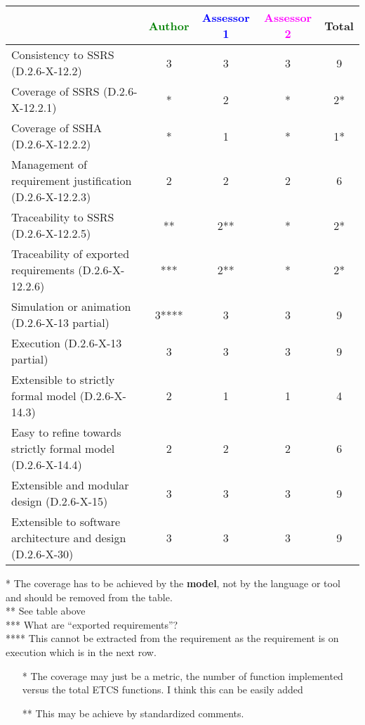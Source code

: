 \begin{tabular}{|l | c | c | c | c|}
\hline
& \textcolor{green}{Author} & \textcolor{blue}{Assessor 1} & \textcolor{magenta}{Assessor 2} & Total \\
\hline
Consistency to SSRS (D.2.6-X-12.2) &3 &3 &3 & 9 \\
\hline
Coverage of SSRS (D.2.6-X-12.2.1) &* &2 &* & 2* \\
\hline
Coverage of SSHA (D.2.6-X-12.2.2) &* &1 &* & 1* \\
\hline
Management of requirement justification (D.2.6-X-12.2.3) &2 &2 &2 & 6 \\
\hline
Traceability to SSRS (D.2.6-X-12.2.5) &** &2** &* & 2* \\
\hline
Traceability of exported requirements (D.2.6-X-12.2.6) &*** & 2**&* & 2* \\
\hline
Simulation or animation (D.2.6-X-13 partial) &3**** & 3 &3 & 9 \\
\hline
Execution (D.2.6-X-13 partial) &3 &3 &3 & 9 \\
\hline
Extensible to strictly formal model (D.2.6-X-14.3) &2 &1 &1 & 4 \\
\hline
Easy to refine towards strictly formal model (D.2.6-X-14.4) &2 &2 &2 & 6 \\
\hline
Extensible and modular design (D.2.6-X-15) &3 &3 &3 & 9 \\
\hline
Extensible to software architecture and design (D.2.6-X-30) &3 &3 &3 & 9 \\
\hline
\end{tabular}

\begin{author_comment}
* The coverage has to be achieved by the \textbf{model}, not by the language or tool and should be removed from the table.\\
** See table above\\
*** What are ``exported requirements''?\\
**** This cannot be extracted from the requirement as the requirement is on execution which is in the next row.
\end{author_comment}
\begin{assessor1}
\begin{itemize}
\item[*] The coverage may just be a metric, the number of function
  implemented versus the total ETCS functions. I think this can be
  easily added
\item[**] This may be achieve by standardized comments.
\end{itemize}
\end{assessor1}

